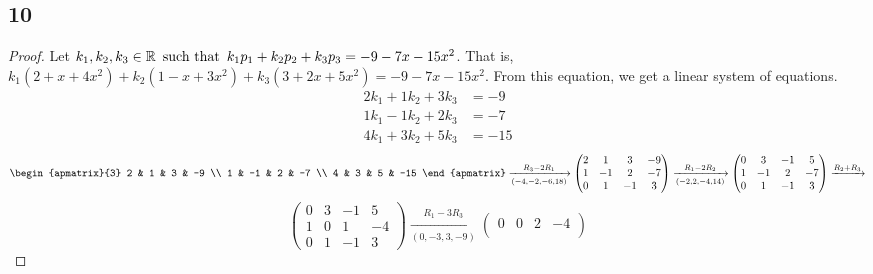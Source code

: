 \documentclass{article}
\begin{document}
\subsection*{10}
\begin{enumerate}
    \begin{proof}
        Let $k_1,k_2,k_3 \in \mathbb{R} \operatorname{~\text{such that}~} k_1p_1 + k_2p_2 + k_3p_3 = -9-7x-15x^2$. That is, $k_1(2 + x + 4x^2) + k_2(1 - x + 3x^2) + k_3(3 + 2x + 5x^2) = -9-7x-15x^2$. From this equation, we get a linear system of equations.
        \begin{align*}
            2k_1 + 1k_2 + 3k_3 & = -9  \\
            1k_1 - 1k_2 + 2k_3 & = -7  \\
            4k_1 + 3k_2 + 5k_3 & = -15
        \end{align*}
        \[
            \begin{apmatrix}{3}
                2 & 1 & 3 & -9 \\
                1 & -1 & 2 & -7 \\
                4 & 3 & 5 & -15
            \end{apmatrix} \xrightarrow[(-4,-2,-6,18)]{R_3 - 2R_1}
            \begin{pmatrix}
                2 & 1  & 3  & -9 \\
                1 & -1 & 2  & -7 \\
                0 & 1  & -1 & 3
            \end{pmatrix} \xrightarrow[(-2,2,-4,14)]{R_1 - 2R_2}
            \begin{pmatrix}
                0 & 3  & -1 & 5  \\
                1 & -1 & 2  & -7 \\
                0 & 1  & -1 & 3
            \end{pmatrix} \xrightarrow{R_2 + R_3}
        \]
        \[
            \begin{pmatrix}
                0 & 3 & -1 & 5  \\
                1 & 0 & 1  & -4 \\
                0 & 1 & -1 & 3
            \end{pmatrix} \xrightarrow[(0,-3,3,-9)]{R_1 - 3R_3}
            \begin{pmatrix}
                0 & 0 & 2  & -4 \\

\end{pmatrix}\]
\end{proof}
\end{enumerate}
\end{document}
